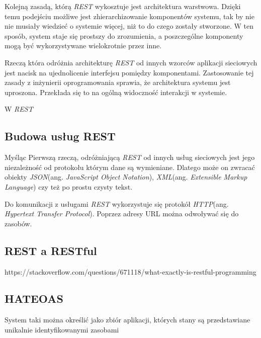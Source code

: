 Kolejną zasadą, którą \textsl{REST} wykosztuje jest architektura warstwowa. Dzięki temu podejściu możliwe jest zhierarchizowanie komponentów systemu, tak by nie nie musiały wiedzieć o systemie więcej, niż to do czego zostały stworzone. W ten sposób, system staje się prostszy do zrozumienia, a poszczególne komponenty mogą być wykorzystywane wielokrotnie przez inne.

Rzeczą która odróżnia architekturę \textsl{REST} od innych wzorców aplikacji sieciowych jest nacisk na ujednolicenie interfejsu pomiędzy komponentami. Zastosowanie tej zasady z inżynierii oprogramowania sprawia, że architektura systemu jest uproszona. Przekłada się to na ogólną widoczność interakcji w systemie. 

W \textsl{REST} 

\subsection{Budowa usług REST}
Myśląc
Pierwszą rzeczą, odróżniającą \textsl{REST} od innych usług sieciowych jest jego niezależność od protokołu którym dane są wymieniane. Dlatego może on zwracać obiekty \textsl{JSON}(ang. \textsl{JavaScript Object Notation}), \textsl{XML}(ang. \textsl{Extensible Markup Language}) czy też po prostu czysty tekst. 

Do komunikacji z usługami \textsl{REST} wykorzystuje się protokół \textsl{HTTP}(ang. \textsl{Hypertext Transfer Protocol}). Poprzez adresy URL można odwoływać się do zasobów.

\subsection{REST a RESTful}
https://stackoverflow.com/questions/671118/what-exactly-is-restful-programming
\subsection{HATEOAS}
System taki można określić jako zbiór aplikacji, których stany są przedstawiane unikalnie identyfikowanymi zasobami